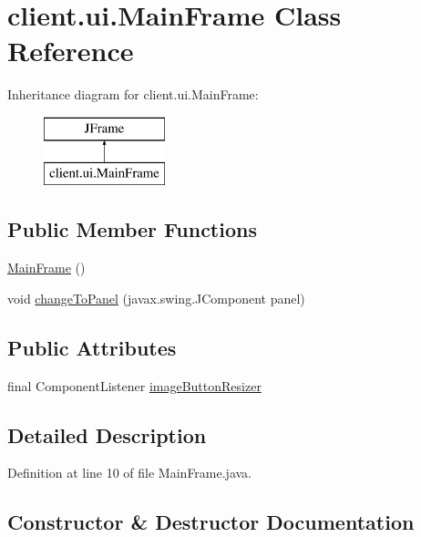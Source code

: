 \hypertarget{classclient_1_1ui_1_1_main_frame}{}\section{client.\+ui.\+Main\+Frame Class Reference}
\label{classclient_1_1ui_1_1_main_frame}
Inheritance diagram for client.\+ui.\+Main\+Frame\+:\begin{figure}[H]
\begin{center}
\leavevmode
\includegraphics[height=2.000000cm]{classclient_1_1ui_1_1_main_frame}
\end{center}
\end{figure}
\subsection*{Public Member Functions}
\begin{DoxyCompactItemize}
\item 
\hyperlink{classclient_1_1ui_1_1_main_frame_ac3662d47eb66c2009f7fc3d0e274a703}{Main\+Frame} ()
\item 
void \hyperlink{classclient_1_1ui_1_1_main_frame_ae415687be6f7197dd0d70d65d08d5221}{change\+To\+Panel} (javax.\+swing.\+J\+Component panel)
\end{DoxyCompactItemize}
\subsection*{Public Attributes}
\begin{DoxyCompactItemize}
\item 
final Component\+Listener \hyperlink{classclient_1_1ui_1_1_main_frame_adc5b4f5b4aa376358a04eddef4741233}{image\+Button\+Resizer}
\end{DoxyCompactItemize}


\subsection{Detailed Description}


Definition at line 10 of file Main\+Frame.\+java.



\subsection{Constructor \& Destructor Documentation}
\hypertarget{classclient_1_1ui_1_1_main_frame_ac3662d47eb66c2009f7fc3d0e274a703}{}\label{classclient_1_1ui_1_1_main_frame_ac3662d47eb66c2009f7fc3d0e274a703} 
